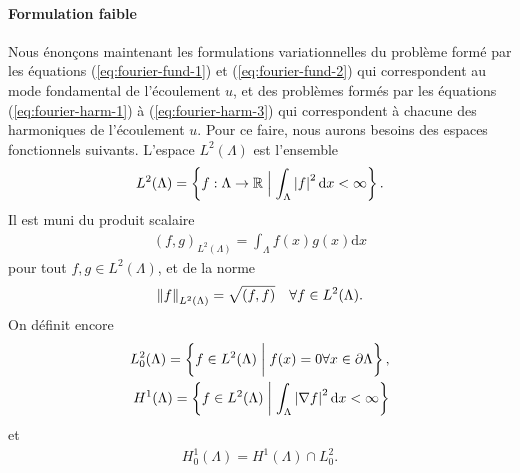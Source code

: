 \paragraph{Formulation faible}\label{sec:stokes-fourier-weak}
Nous énonçons maintenant les formulations variationnelles du problème
formé par les équations (\ref{eq:fourier-fund-1}) et
(\ref{eq:fourier-fund-2}) qui correspondent au mode fondamental de
l'écoulement $u$, et des problèmes formés par les équations
(\ref{eq:fourier-harm-1}) à (\ref{eq:fourier-harm-3}) qui
correspondent à chacune des harmoniques de l'écoulement $u$. Pour ce
faire, nous aurons besoins des espaces fonctionnels suivants. L'espace
$L^2(\Lambda)$ est l'ensemble
\begin{align}
  L^2(\Lambda) = \left\{ f:\Lambda\to\mathbb R \mathrel{\Big|} \int_\Lambda
    \left\lvert f \right\rvert^2\mathrm dx < \infty \right\}.
\end{align}
Il est muni du produit scalaire
\begin{align}
  (f, g)_{L^2(\Lambda)} = \int_\Lambda f(x)g(x)\mathrm dx
\end{align}
pour tout $f, g\in L^2(\Lambda)$, et de la norme
\begin{align}
  \left\lVert f \right\rVert_{L^2(\Lambda)} = \sqrt{(f, f)}\quad\forall f\in L^2(\Lambda).
\end{align}
On définit encore
\begin{align}
  L^2_0(\Lambda) = \left\{ f\in L^2(\Lambda)\mathrel{\bigg|} f(x) = 0 \forall
    x\in \partial\Lambda \right\},\\
  H^1(\Lambda) = \left\{ f\in L^2(\Lambda)\mathrel{\bigg|} \int_\Lambda
    \left\lvert \nabla f \right\rvert^2 \mathrm dx < \infty \right\}
\end{align}
et
\begin{align}
  H^1_0(\Lambda) = H^1(\Lambda) \cap L^2_0.
\end{align}

